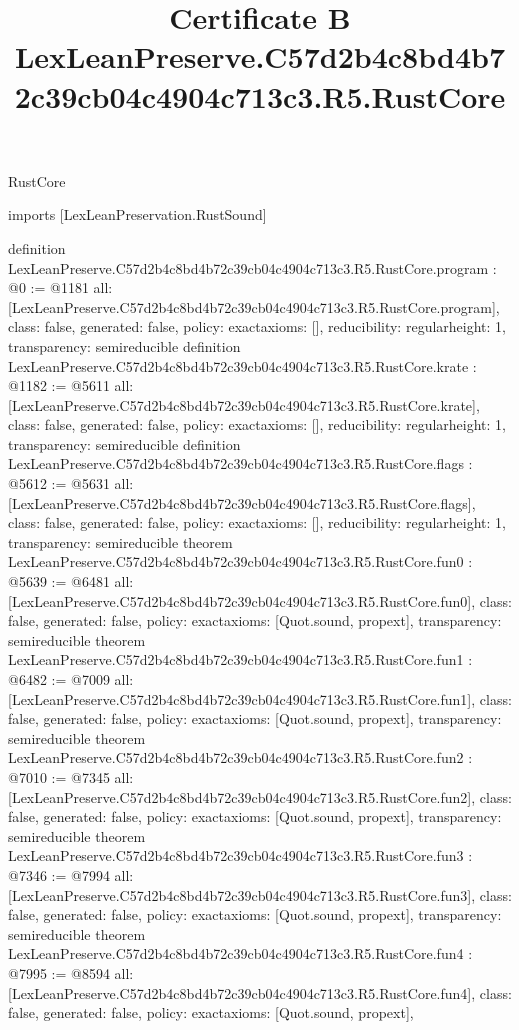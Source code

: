 \begin{lexlean}{RustCore}
\title{Certificate B LexLeanPreserve.C57d2b4c8bd4b72c39cb04c4904c713c3.R5.RustCore}
\begin{coremodule}
imports [LexLeanPreservation.RustSound]

definition LexLeanPreserve.C57d2b4c8bd4b72c39cb04c4904c713c3.R5.RustCore.program : @0 := @1181 {
  all: [LexLeanPreserve.C57d2b4c8bd4b72c39cb04c4904c713c3.R5.RustCore.program],
  class: false,
  generated: false,
  policy: exact{axioms: []},
  reducibility: regular{height: 1},
  transparency: semireducible
}
definition LexLeanPreserve.C57d2b4c8bd4b72c39cb04c4904c713c3.R5.RustCore.krate : @1182 := @5611 {
  all: [LexLeanPreserve.C57d2b4c8bd4b72c39cb04c4904c713c3.R5.RustCore.krate],
  class: false,
  generated: false,
  policy: exact{axioms: []},
  reducibility: regular{height: 1},
  transparency: semireducible
}
definition LexLeanPreserve.C57d2b4c8bd4b72c39cb04c4904c713c3.R5.RustCore.flags : @5612 := @5631 {
  all: [LexLeanPreserve.C57d2b4c8bd4b72c39cb04c4904c713c3.R5.RustCore.flags],
  class: false,
  generated: false,
  policy: exact{axioms: []},
  reducibility: regular{height: 1},
  transparency: semireducible
}
theorem LexLeanPreserve.C57d2b4c8bd4b72c39cb04c4904c713c3.R5.RustCore.fun0 : @5639 := @6481 {
  all: [LexLeanPreserve.C57d2b4c8bd4b72c39cb04c4904c713c3.R5.RustCore.fun0],
  class: false,
  generated: false,
  policy: exact{axioms: [Quot.sound, propext]},
  transparency: semireducible
}
theorem LexLeanPreserve.C57d2b4c8bd4b72c39cb04c4904c713c3.R5.RustCore.fun1 : @6482 := @7009 {
  all: [LexLeanPreserve.C57d2b4c8bd4b72c39cb04c4904c713c3.R5.RustCore.fun1],
  class: false,
  generated: false,
  policy: exact{axioms: [Quot.sound, propext]},
  transparency: semireducible
}
theorem LexLeanPreserve.C57d2b4c8bd4b72c39cb04c4904c713c3.R5.RustCore.fun2 : @7010 := @7345 {
  all: [LexLeanPreserve.C57d2b4c8bd4b72c39cb04c4904c713c3.R5.RustCore.fun2],
  class: false,
  generated: false,
  policy: exact{axioms: [Quot.sound, propext]},
  transparency: semireducible
}
theorem LexLeanPreserve.C57d2b4c8bd4b72c39cb04c4904c713c3.R5.RustCore.fun3 : @7346 := @7994 {
  all: [LexLeanPreserve.C57d2b4c8bd4b72c39cb04c4904c713c3.R5.RustCore.fun3],
  class: false,
  generated: false,
  policy: exact{axioms: [Quot.sound, propext]},
  transparency: semireducible
}
theorem LexLeanPreserve.C57d2b4c8bd4b72c39cb04c4904c713c3.R5.RustCore.fun4 : @7995 := @8594 {
  all: [LexLeanPreserve.C57d2b4c8bd4b72c39cb04c4904c713c3.R5.RustCore.fun4],
  class: false,
  generated: false,
  policy: exact{axioms: [Quot.sound, propext]},
}
\end{coremodule}
\end{lexlean}
